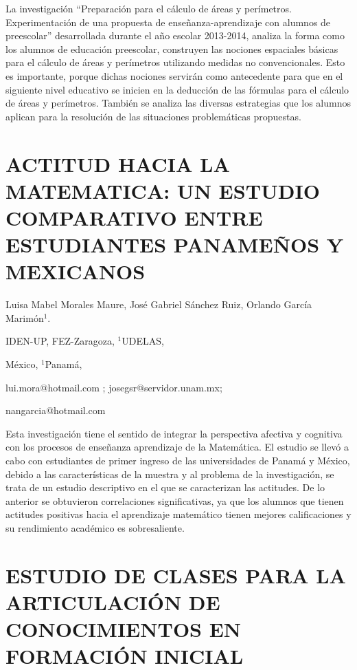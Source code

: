 La investigación “Preparación para el cálculo de áreas y perímetros.
Experimentación de una propuesta de enseñanza-aprendizaje con alumnos
de preescolar” desarrollada durante el año escolar 2013-2014, analiza
la forma como los alumnos de educación preescolar, construyen las
nociones espaciales básicas para el cálculo de áreas y perímetros
utilizando medidas no convencionales. Esto es importante, porque dichas
nociones servirán como antecedente para que en el siguiente nivel
educativo se inicien en la deducción de las fórmulas para el cálculo
de áreas y perímetros. También se analiza las diversas estrategias
que los alumnos aplican para la resolución de las situaciones problemáticas
propuestas.


\section{ACTITUD HACIA LA MATEMATICA: UN ESTUDIO COMPARATIVO ENTRE ESTUDIANTES
PANAMEÑOS Y MEXICANOS}

\begin{datos}

Luisa Mabel Morales Maure, José Gabriel Sánchez Ruiz, Orlando García
Marimón$^{1}$.

IDEN-UP, FEZ-Zaragoza, $^{1}$UDELAS,

México, $^{1}$Panamá,

lui.mora@hotmail.com ; josegsr@servidor.unam.mx;

nangarcia@hotmail.com 

\end{datos}

Esta investigación tiene el sentido de integrar la perspectiva afectiva
y cognitiva con los procesos de enseñanza aprendizaje de la Matemática.
El estudio se llevó a cabo con estudiantes de primer ingreso de las
universidades de Panamá y México, debido a las características de
la muestra y al problema de la investigación, se trata de un estudio
descriptivo en el que se caracterizan las actitudes. De lo anterior
se obtuvieron correlaciones significativas, ya que los alumnos que
tienen actitudes positivas hacia el aprendizaje matemático tienen
mejores calificaciones y su rendimiento académico es sobresaliente. 


\section{ESTUDIO DE CLASES PARA LA ARTICULACIÓN DE CONOCIMIENTOS EN FORMACIÓN
INICIAL}

